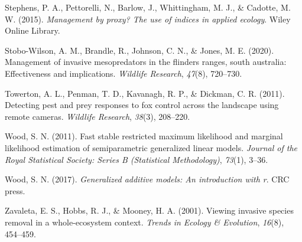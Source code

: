 \documentclass[]{elsarticle} %
\begin{document}
\leavevmode\hypertarget{ref-stephens2015}{}%
Stephens, P. A., Pettorelli, N., Barlow, J., Whittingham, M. J., \& Cadotte, M. W. (2015). \emph{Management by proxy? The use of indices in applied ecology}. Wiley Online Library.

\leavevmode\hypertarget{ref-stobo2020management}{}%
Stobo-Wilson, A. M., Brandle, R., Johnson, C. N., \& Jones, M. E. (2020). Management of invasive mesopredators in the flinders ranges, south australia: Effectiveness and implications. \emph{Wildlife Research}, \emph{47}(8), 720--730.

\leavevmode\hypertarget{ref-towerton2011}{}%
Towerton, A. L., Penman, T. D., Kavanagh, R. P., \& Dickman, C. R. (2011). Detecting pest and prey responses to fox control across the landscape using remote cameras. \emph{Wildlife Research}, \emph{38}(3), 208--220.

\leavevmode\hypertarget{ref-wood2011}{}%
Wood, S. N. (2011). Fast stable restricted maximum likelihood and marginal likelihood estimation of semiparametric generalized linear models. \emph{Journal of the Royal Statistical Society: Series B (Statistical Methodology)}, \emph{73}(1), 3--36.

\leavevmode\hypertarget{ref-wood2017}{}%
Wood, S. N. (2017). \emph{Generalized additive models: An introduction with r}. CRC press.

\leavevmode\hypertarget{ref-zavaleta2001}{}%
Zavaleta, E. S., Hobbs, R. J., \& Mooney, H. A. (2001). Viewing invasive species removal in a whole-ecosystem context. \emph{Trends in Ecology \& Evolution}, \emph{16}(8), 454--459.
\end{document}

